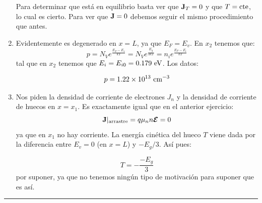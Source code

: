 \begin{enumerate}[label=\alph*)]
	Para determinar que está en equilibrio basta ver que $\mathbf{J}_T=0$ y que $T=\text{cte}$, lo cual es cierto. Para ver que $\mathbf{J}=0$ debemos seguir el mismo procedimiento que antes.
	\item  Evidentemente es degenerado en $x=L$, ya que $E_F=E_v$. En $x_2$ tenemos que: 
	\begin{equation}
		p = N_V e^{\frac{E_F-E_v}{kT}} = N_V e^{\frac{E_g}{3kT}} = n_i e^{\frac{E_F-E_i}{kT}}
	\end{equation}
	tal que en $x_2$ tenemos que $E_i=E_{i0}=0.179 \ \text{eV}$. Los datos:

	\begin{equation}
		p = 1.22 \times 10^{13} \ \cm^{-3}
	\end{equation}
	\item Nos piden la densidad de corriente de electrones $J_n$ y la densidad de corriente de huecos en $x=x_1$. Es exactamente igual que en el anterior ejercicio:
	\begin{equation}
		\mathbf{J}|_{\text{{arrastre}}} = q \mu_n n \boldsymbol{\mathcal{E}} = 0
	\end{equation}
	ya que en $x_1$ no hay corriente. La energía cinética del hueco $T$ viene dada por la diferencia entre $E_v=0$ (en $x=L$) y $-E_g/3$. Así pues:

	\begin{equation}
		T = - \frac{-E_g}{3}
	\end{equation}
	por suponer, ya que no tenemos ningún tipo de motivación para suponer que es así. 

\end{enumerate}

\rule{\textwidth}{0.1pt} \\[2pt]







